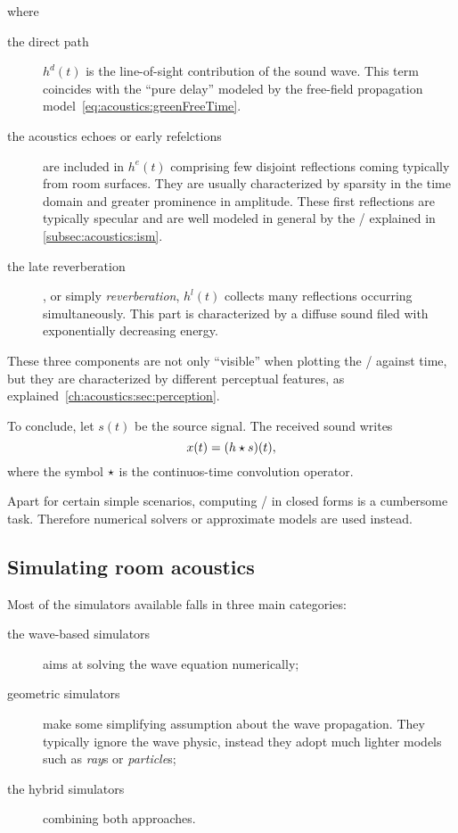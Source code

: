 where
\begin{description}
    \item[the direct path] $h^d(t)$ is the line-of-sight contribution of the sound wave.
    This term coincides with the ``pure delay'' modeled by the free-field propagation model~\eqref{eq:acoustics:greenFreeTime}.
    \item[the acoustics echoes or early refelctions] are included in $h^e(t)$ comprising few disjoint reflections coming typically from room surfaces.
    They are usually characterized by sparsity in the time domain and greater prominence in amplitude.
    These first reflections are typically specular and are well modeled in general by the \ISMdef/ explained in \cref{subsec:acoustics:ism}.
    \item[the late reverberation], or simply \textit{reverberation}, $h^l(t)$ collects many reflections occurring simultaneously.
    This part is characterized by a diffuse sound filed with exponentially decreasing energy.
\end{description}
These three components are not only ``visible'' when plotting the \RIR/ against time,
but they are characterized by different perceptual features, as explained~\cref{ch:acoustics:sec:perception}.

\mynewline
To conclude, let $s(t)$ be the source signal. The received sound writes
\begin{equation}
    x(t) = (h \star s)(t)
    ,
\end{equation}
where the symbol $\star$ is the continuos-time convolution operator.

Apart for certain simple scenarios, computing \RIRs/ in closed forms is a cumbersome task.
Therefore numerical solvers or approximate models are used instead.

\subsection{Simulating room acoustics}\label{sec:acoustics:simulators}
Most of the simulators available falls in three main categories:
\begin{description}
    \item[the wave-based simulators] aims at solving the wave equation numerically;
    \item[geometric simulators] make some simplifying assumption about the wave propagation.
    They typically ignore the wave physic, instead they adopt much lighter models such as \textit{ray}s or \textit{particle}s;
    \item[the hybrid simulators] combining both approaches.
\end{description}

